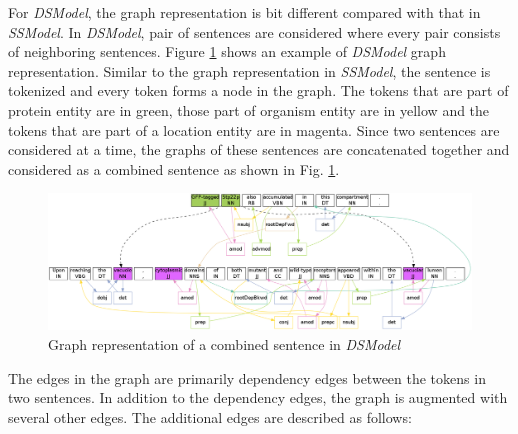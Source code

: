 
For \textit{DSModel}, the graph representation is bit different compared with that in \textit{SSModel}. In \textit{DSModel}, pair of sentences are considered where every pair consists of neighboring sentences. Figure \ref{fig:DSGraph} shows an example of \textit{DSModel} graph representation. Similar to the graph representation in \textit{SSModel}, the sentence is tokenized and every token forms a node in the graph. The tokens that are part of protein entity are in green, those part of organism entity are in yellow and the tokens that are part of a location entity are in magenta. Since two sentences are considered at a time, the graphs of these sentences are concatenated together and considered as a combined sentence as shown in Fig. \ref{fig:DSGraph}. 

\begin{figure}
\centering
\includegraphics[scale=0.3]{figures/DiffSentenceGraph.png}
\caption{Graph representation of a combined sentence in \textit{DSModel}}\label{fig:DSGraph}
\end{figure}


The edges in the graph are primarily dependency edges between the tokens in two sentences. In addition to the dependency edges, the graph is augmented with several other edges. The additional edges are described as follows:

